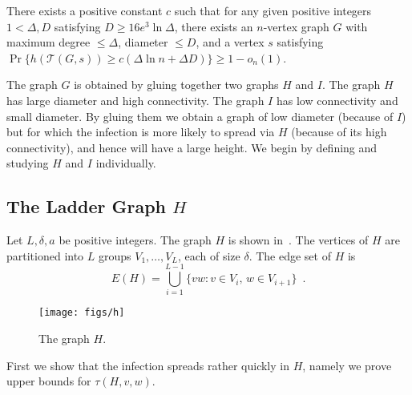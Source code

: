 \documentclass{patmorin}
\newcommand{\tcal}{\mathcal{T}}
\begin{document}
\begin{thm}
There exists a positive constant $c$ such that 
for any given positive integers $1<\Delta, D$ satisfying
$D\geq 16e^3 \ln \Delta$,
there exists an $n$-vertex graph $G$ with 
maximum degree $\leq \Delta$,
diameter $\leq D$, and
a vertex $s$ satisfying
$\Pr\{h(\tcal(G,s)) \geq c(\Delta \ln n + \Delta D)\}\geq 1-o_n(1)$.
\end{thm}


The graph $G$ is obtained by gluing together two graphs $H$ and $I$.
The graph $H$ has large diameter and high connectivity.  The graph $I$
has low connectivity and small diameter.  By gluing them we obtain a graph
of low diameter (because of $I$) but for which the infection is more likely to spread via $H$ (because of its high connectivity), and hence will have a large height.  We begin by
defining and studying $H$ and $I$ individually.


\subsection{The Ladder Graph $H$}

Let $L,\delta,a$ be positive integers.
The graph $H$ is shown in~.  The vertices of $H$ are partitioned into $L$ groups
$V_1,\ldots,V_L$, each of size $\delta$. The edge set of $H$ is
\[
   E(H) = \bigcup_{i=1}^{L-1} \{vw : v\in V_{i},\, w\in V_{i+1}\} \enspace .
\]
\begin{figure}
  \begin{center}
    \texttt{[image: figs/h]} 
  \end{center}
  \caption{The graph $H$.}
\end{figure}

First we show that the infection spreads rather quickly in $H$, namely we prove upper bounds for $\tau(H,v,w)$.
\end{document}
